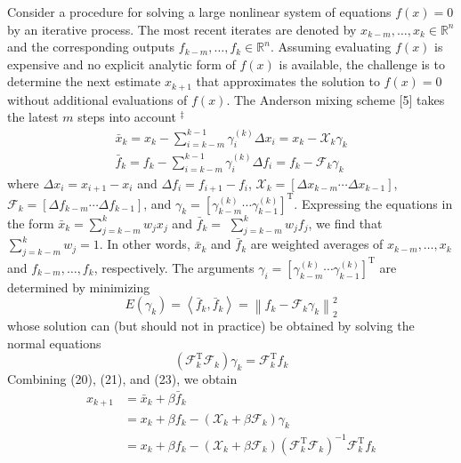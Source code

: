Consider a procedure for solving a large nonlinear system of equations \(f(x)=0\) by an iterative process. 
The most recent iterates are denoted by \(x_{k-m}, \ldots, x_{k} \in \mathbb{R}^{n}\) and the corresponding outputs \(f_{k-m}, \ldots, f_{k} \in \mathbb{R}^{n}\). 
Assuming evaluating \(f(x)\) is expensive and no explicit analytic form of \(f(x)\) is available, the challenge is to determine the next estimate \(x_{k+1}\) that approximates the solution to \(f(x)=0\) without additional evaluations of \(f(x)\).
The Anderson mixing scheme [5] takes the latest \(m\) steps into account \({ }^{\ddagger}\) 
\begin{align}
  \bar{x}_{k}=x_{k}-\sum_{i=k-m}^{k-1} \gamma_{i}^{(k)} \Delta x_{i}=x_{k}-\mathscr{X}_{k} \gamma_{k} \\
  \bar{f}_{k}=f_{k}-\sum_{i=k-m}^{k-1} \gamma_{i}^{(k)} \Delta f_{i}=f_{k}-\mathscr{F}_{k} \gamma_{k}
\end{align}
where \(\Delta x_{i}=x_{i+1}-x_{i}\) and \(\Delta f_{i}=f_{i+1}-f_{i}\), \(\mathscr{X}_{k}=\left[\Delta x_{k-m} \cdots \Delta x_{k-1}\right]\), \(\mathscr{F}_{k}=\left[\Delta f_{k-m} \cdots \Delta f_{k-1}\right]\), and \(\gamma_{k}=\left[\gamma_{k-m}^{(k)} \cdots \gamma_{k-1}^{(k)}\right]^{\mathrm{T}}\). Expressing the equations in the form \(\bar{x}_{k}=\sum_{j=k-m}^{k} w_{j} x_{j}\) and \(\bar{f}_{k}=\) \(\sum_{j=k-m}^{k} w_{j} f_{j}\), we find that \(\sum_{j=k-m}^{k} w_{j}=1\). In other words, \(\bar{x}_{k}\) and \(\bar{f}_{k}\) are weighted averages of \(x_{k-m}, \ldots, x_{k}\) and \(f_{k-m}, \ldots, f_{k}\), respectively.
The arguments \(\gamma_{i}=\left[\gamma_{k-m}^{(k)} \cdots \gamma_{k-1}^{(k)}\right]^{\mathrm{T}}\) are determined by minimizing
\begin{equation}
E\left(\gamma_{k}\right)=\left\langle\bar{f}_{k}, \bar{f}_{k}\right\rangle=\left\|f_{k}-\mathscr{F}_{k} \gamma_{k}\right\|_{2}^{2}
\end{equation}
whose solution can (but should not in practice) be obtained by solving the normal equations
\begin{equation}
\left(\mathscr{F}_{k}^{\mathrm{T}} \mathscr{F}_{k}\right) \gamma_{k}=\mathscr{F}_{k}^{\mathrm{T}} f_{k}
\end{equation}
Combining (20), (21), and (23), we obtain
\begin{align}
x_{k+1} &=\bar{x}_{k}+\beta \bar{f}_{k} \\
&=x_{k}+\beta f_{k}-\left(\mathscr{X}_{k}+\beta \mathscr{F}_{k}\right) \gamma_{k} \\
&=x_{k}+\beta f_{k}-\left(\mathscr{X}_{k}+\beta \mathscr{F}_{k}\right)\left(\mathscr{F}_{k}^{\mathrm{T}} \mathscr{F}_{k}\right)^{-1} \mathscr{F}_{k}^{\mathrm{T}} f_{k}
\end{align}

